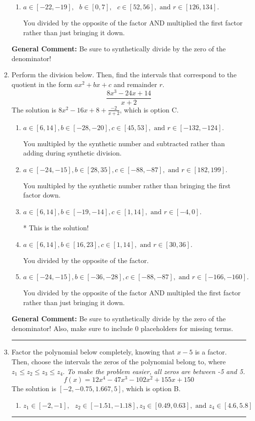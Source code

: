 \documentclass{extbook}[14pt]
\newcommand{\litem}[1]{\item #1

\rule{\textwidth}{0.4pt}}
\begin{document}
\begin{enumerate}
{\begin{enumerate}[label=\Alph*.]
 You divided by the opposite of the factor.
\item \( a \in [-22, -19], \text{   } b \in [0, 7], \text{   } c \in [52, 56], \text{   and   } r \in [126, 134]. \)

 You divided by the opposite of the factor AND multiplied the first factor rather than just bringing it down.
\end{enumerate}

\textbf{General Comment:} Be sure to synthetically divide by the zero of the denominator!
}
\litem{
Perform the division below. Then, find the intervals that correspond to the quotient in the form $ax^2+bx+c$ and remainder $r$.
\[ \frac{8x^{3} -24 x + 14}{x + 2} \]The solution is \( 8x^{2} -16 x + 8 + \frac{-2}{x + 2} \), which is option C.\begin{enumerate}[label=\Alph*.]
\item \( a \in [6, 14], b \in [-28, -20], c \in [45, 53], \text{ and } r \in [-132, -124]. \)

 You multipled by the synthetic number and subtracted rather than adding during synthetic division.
\item \( a \in [-24, -15], b \in [28, 35], c \in [-88, -87], \text{ and } r \in [182, 199]. \)

 You multipled by the synthetic number rather than bringing the first factor down.
\item \( a \in [6, 14], b \in [-19, -14], c \in [1, 14], \text{ and } r \in [-4, 0]. \)

* This is the solution!
\item \( a \in [6, 14], b \in [16, 23], c \in [1, 14], \text{ and } r \in [30, 36]. \)

 You divided by the opposite of the factor.
\item \( a \in [-24, -15], b \in [-36, -28], c \in [-88, -87], \text{ and } r \in [-166, -160]. \)

 You divided by the opposite of the factor AND multipled the first factor rather than just bringing it down.
\end{enumerate}

\textbf{General Comment:} Be sure to synthetically divide by the zero of the denominator! Also, make sure to include 0 placeholders for missing terms.
}
\litem{
Factor the polynomial below completely, knowing that $x -5$ is a factor. Then, choose the intervals the zeros of the polynomial belong to, where $z_1 \leq z_2 \leq z_3 \leq z_4$. \textit{To make the problem easier, all zeros are between -5 and 5.}
\[ f(x) = 12x^{4} -47 x^{3} -102 x^{2} +155 x + 150 \]The solution is \( [-2, -0.75, 1.667, 5] \), which is option B.\begin{enumerate}[label=\Alph*.]
\item \( z_1 \in [-2, -1], \text{   }  z_2 \in [-1.51, -1.18], z_3 \in [0.49, 0.63], \text{   and   } z_4 \in [4.6, 5.8] \)


\end{enumerate}}
\end{enumerate}
\end{document}
